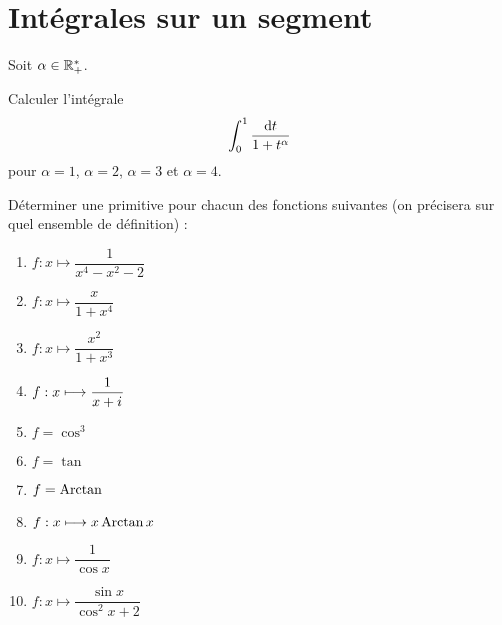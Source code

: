 \chapter{Intégrales sur un segment}

\minitoc

\begin{exo}[Exercice 1]
Soit \(\alpha\in\mathbb{R}_+^*\).

Calculer l'intégrale \[\int_0^1\dfrac{\odif{t}}{1+t^{\alpha}}\] pour \(\alpha=1\), \(\alpha=2\), \(\alpha=3\) et \(\alpha=4\).
\end{exo}

\begin{corr}
\end{corr}

\begin{exo}[Exercice 2]
Déterminer une primitive pour chacun des fonctions suivantes (on précisera sur quel ensemble de définition) :

\begin{enumerate}
\item \(f:x\mapsto\dfrac{1}{x^4-x^2-2}\) \\

\item \(f:x\mapsto\dfrac{x}{1+x^4}\) \\

\item \(f:x\mapsto\dfrac{x^2}{1+x^3}\) \\

\item \(f:x\longmapsto\dfrac{1}{x+i\mkern1mu}\) \\

\item \(f=\cos^3\) \\

\item \(f=\tan\) \\

\item \(f=\operatorname{Arctan}\) \\

\item \(f:x\longmapsto x\operatorname{Arctan} x\) \\

\item \(f:x\mapsto\dfrac{1}{\cos x}\) \\

\item \(f:x\mapsto\dfrac{\sin x}{\cos^2x+2}\) \\


\end{enumerate}
\end{exo}
